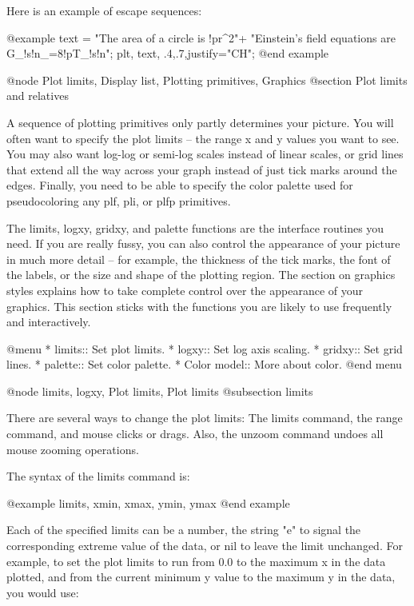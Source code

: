 Here is an example of escape sequences:

@example
text = "The area of a circle is !pr^2\n"+
  "Einstein's field equations are G_!s!n_=8!pT_!s!n";
plt, text, .4,.7,justify="CH";
@end example


@node Plot limits, Display list, Plotting primitives, Graphics
@section Plot limits and relatives

A sequence of plotting primitives only partly determines your picture.
You will often want to specify the plot limits -- the range x and y
values you want to see.  You may also want log-log or semi-log scales
instead of linear scales, or grid lines that extend all the way across
your graph instead of just tick marks around the edges.  Finally, you
need to be able to specify the color palette used for pseudocoloring
any plf, pli, or plfp primitives.

The limits, logxy, gridxy, and palette functions are the interface
routines you need.  If you are really fussy, you can also control the
appearance of your picture in much more detail -- for example, the
thickness of the tick marks, the font of the labels, or the size and
shape of the plotting region.  The section on graphics styles explains
how to take complete control over the appearance of your graphics.
This section sticks with the functions you are likely to use
frequently and interactively.

@menu
* limits::                      Set plot limits.
* logxy::                       Set log axis scaling.
* gridxy::                      Set grid lines.
* palette::                     Set color palette.
* Color model::                 More about color.
@end menu

@node limits, logxy, Plot limits, Plot limits
@subsection limits

There are several ways to change the plot limits: The limits command,
the range command, and mouse clicks or drags.  Also, the unzoom
command undoes all mouse zooming operations.

The syntax of the limits command is:

@example
limits, xmin, xmax, ymin, ymax
@end example

Each of the specified limits can be a number, the string "e" to signal
the corresponding extreme value of the data, or nil to leave the limit
unchanged.  For example, to set the plot limits to run from 0.0 to the
maximum x in the data plotted, and from the current minimum y value to
the maximum y in the data, you would use:

